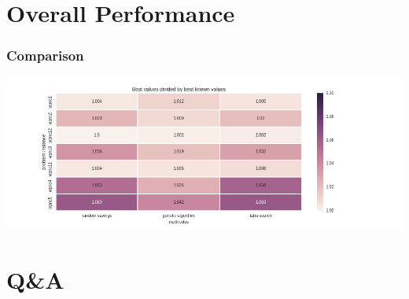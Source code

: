 \documentclass{beamer}
\begin{document}
\section{Overall Performance}

\begin{frame}
\frametitle{Comparison}
\includegraphics[scale=0.35]{figs/best_values}
\end{frame}


\section{Q\&A}
\end{document}
